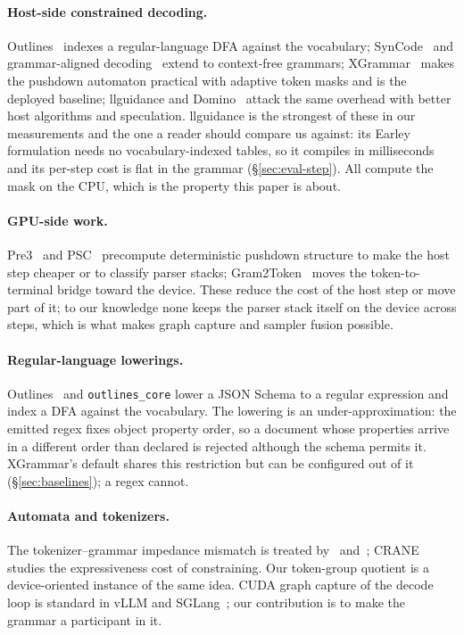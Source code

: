 \documentclass{article}
\begin{document}
\paragraph{Host-side constrained decoding.} Outlines~\cite{willard2023efficient}
indexes a regular-language DFA against the vocabulary;
SynCode~\cite{ugare2025syncode} and grammar-aligned
decoding~\cite{park2024grammaraligned} extend to context-free grammars;
XGrammar~\cite{dong2024xgrammar} makes the pushdown automaton practical with
adaptive token masks and is the deployed baseline;
llguidance and Domino~\cite{beurerkellner2024domino} attack the same overhead
with better host algorithms and speculation. llguidance is the strongest of
these in our measurements and the one a reader should compare us against: its
Earley formulation needs no vocabulary-indexed tables, so it compiles in
milliseconds and its per-step cost is flat in the grammar
(\S\ref{sec:eval-step}). All compute the mask on the CPU, which is the
property this paper is about.

\paragraph{GPU-side work.} Pre3~\cite{chen2025pre3} and PSC~\cite{li2026psc}
precompute deterministic pushdown structure to make the host step cheaper or to
classify parser stacks; Gram2Token~\cite{hua2026gram2token} moves the
token-to-terminal bridge toward the device. These reduce the cost of the host
step or move part of it; to our knowledge none keeps the parser stack itself on
the device across steps, which is what makes graph capture and sampler fusion
possible.

\paragraph{Regular-language lowerings.} Outlines~\cite{willard2023efficient}
and \texttt{outlines\_core} lower a JSON Schema to a regular expression and
index a DFA against the vocabulary. The lowering is an under-approximation: the
emitted regex fixes object property order, so a document whose properties
arrive in a different order than declared is rejected although the schema
permits it. XGrammar's default shares this restriction but can be configured
out of it (\S\ref{sec:baselines}); a regex cannot.

\paragraph{Automata and tokenizers.} The tokenizer--grammar impedance mismatch
is treated by~\cite{koo2024automata} and~\cite{park2025flexible};
CRANE~\cite{banerjee2025crane} studies the expressiveness cost of constraining.
Our token-group quotient is a device-oriented instance of the same idea. CUDA
graph capture of the decode loop is standard in vLLM and
SGLang~\cite{zheng2024sglang}; our contribution is to make the grammar a
participant in it.
\end{document}

